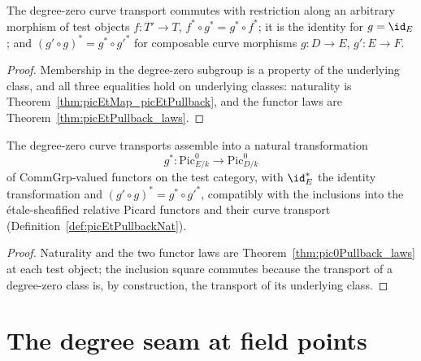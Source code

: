 \begin{theorem}
  \label{thm:pic0Pullback_laws}
  \leanok
  The degree-zero curve transport commutes with restriction along an arbitrary
  morphism of test objects \(f \colon T' \to T\),
  \(f^{*} \circ g^{*} = g^{*} \circ f^{*}\); it is the identity for \(g = \id_E\); and
  \((g' \circ g)^{*} = g^{*} \circ g'^{*}\) for composable curve morphisms
  \(g \colon D \to E\), \(g' \colon E \to F\).
\end{theorem}
\begin{proof}
  \leanok
  Membership in the degree-zero subgroup is a property of the underlying class, and
  all three equalities hold on underlying classes: naturality is
  Theorem~\ref{thm:picEtMap_picEtPullback}, and the functor laws are
  Theorem~\ref{thm:picEtPullback_laws}.
\end{proof}

\begin{definition}
  \label{def:pic0PullbackNat}
  \leanok
  The degree-zero curve transports assemble into a natural transformation
  \[
    g^{*} \colon \mathrm{Pic}^0_{E/k} \longrightarrow \mathrm{Pic}^0_{D/k}
  \]
  of \(\mathrm{CommGrp}\)-valued functors on the test category, with \(\id_E^{*}\) the
  identity transformation and \((g' \circ g)^{*} = g^{*} \circ g'^{*}\), compatibly
  with the inclusions into the \'etale-sheafified relative Picard functors and their
  curve transport (Definition~\ref{def:picEtPullbackNat}).
\end{definition}
\begin{proof}
  \leanok
  Naturality and the two functor laws are Theorem~\ref{thm:pic0Pullback_laws} at each
  test object; the inclusion square commutes because the transport of a degree-zero
  class is, by construction, the transport of its underlying class.
\end{proof}

\section{The degree seam at field points}
\label{sec:degreeSeam}

